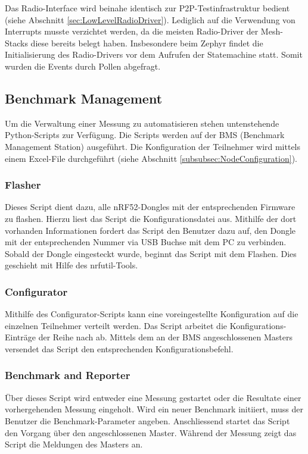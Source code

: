 Das Radio-Interface wird beinahe identisch zur P2P-Testinfrastruktur bedient (siehe Abschnitt \ref{sec:LowLevelRadioDriver}).
Lediglich auf die Verwendung von Interrupts musste verzichtet werden, da die meisten Radio-Driver der Mesh-Stacks diese bereits belegt haben.
Insbesondere beim Zephyr findet die Initialisierung des Radio-Drivers vor dem Aufrufen der Statemachine statt.
Somit wurden die Events durch Pollen abgefragt.


\subsection{Benchmark Management}\label{subsec:Benchmark Management}

Um die Verwaltung einer Messung zu automatisieren stehen untenstehende Python-Scripts zur Verfügung.
Die Scripts werden auf der BMS (Benchmark Management Station) ausgeführt.
Die Konfiguration der Teilnehmer wird mittels einem Excel-File durchgeführt (siehe Abschnitt \ref{subsubsec:NodeConfiguration}). 


\subsubsection{Flasher}\label{subsubsec:Flash}
Dieses Script dient dazu, alle nRF52-Dongles mit der entsprechenden Firmware zu flashen.
Hierzu liest das Script die Konfigurationsdatei aus.
Mithilfe der dort vorhanden Informationen fordert das Script den Benutzer dazu auf, den Dongle mit der entsprechenden Nummer via USB Buchse mit dem PC zu verbinden.
Sobald der Dongle eingesteckt wurde, beginnt das Script mit dem Flashen.
Dies geschieht mit Hilfe des nrfutil-Tools. 

\subsubsection{Configurator}\label{subsubsec:Configurator}
Mithilfe des Configurator-Scripts kann eine voreingestellte Konfiguration auf die einzelnen Teilnehmer verteilt werden.
Das Script arbeitet die Konfigurations-Einträge der Reihe nach ab.
Mittels dem an der BMS angeschlossenen Masters versendet das Script den entsprechenden Konfigurationsbefehl. 

\subsubsection{Benchmark and Reporter}\label{subsubsec:BenchmarkandReporter}
Über dieses Script wird entweder eine Messung gestartet oder die Resultate einer vorhergehenden Messung eingeholt.
Wird ein neuer Benchmark initiiert, muss der Benutzer die Benchmark-Parameter angeben.
Anschliessend startet das Script den Vorgang über den angeschlossenen Master.
Während der Messung zeigt das Script die Meldungen des Masters an.

